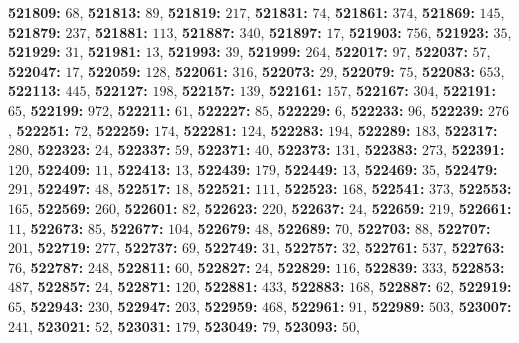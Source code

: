 \textsf{\bfseries 521809:} $68$, \textsf{\bfseries 521813:} $89$, \textsf{\bfseries 521819:} $217$, \textsf{\bfseries 521831:} $74$, \textsf{\bfseries 521861:} $374$, \textsf{\bfseries 521869:} $145$, \textsf{\bfseries 521879:} $237$, \textsf{\bfseries 521881:} $113$, \textsf{\bfseries 521887:} $340$, \textsf{\bfseries 521897:} $17$, \textsf{\bfseries 521903:} $756$, \textsf{\bfseries 521923:} $35$, \textsf{\bfseries 521929:} $31$, \textsf{\bfseries 521981:} $13$, \textsf{\bfseries 521993:} $39$, \textsf{\bfseries 521999:} $264$, \textsf{\bfseries 522017:} $97$, \textsf{\bfseries 522037:} $57$, \textsf{\bfseries 522047:} $17$, \textsf{\bfseries 522059:} $128$, \textsf{\bfseries 522061:} $316$, \textsf{\bfseries 522073:} $29$, \textsf{\bfseries 522079:} $75$, \textsf{\bfseries 522083:} $653$, \textsf{\bfseries 522113:} $445$, \textsf{\bfseries 522127:} $198$, \textsf{\bfseries 522157:} $139$, \textsf{\bfseries 522161:} $157$, \textsf{\bfseries 522167:} $304$, \textsf{\bfseries 522191:} $65$, \textsf{\bfseries 522199:} $972$, \textsf{\bfseries 522211:} $61$, \textsf{\bfseries 522227:} $85$, \textsf{\bfseries 522229:} $6$, \textsf{\bfseries 522233:} $96$, \textsf{\bfseries 522239:} $276$, \textsf{\bfseries 522251:} $72$, \textsf{\bfseries 522259:} $174$, \textsf{\bfseries 522281:} $124$, \textsf{\bfseries 522283:} $194$, \textsf{\bfseries 522289:} $183$, \textsf{\bfseries 522317:} $280$, \textsf{\bfseries 522323:} $24$, \textsf{\bfseries 522337:} $59$, \textsf{\bfseries 522371:} $40$, \textsf{\bfseries 522373:} $131$, \textsf{\bfseries 522383:} $273$, \textsf{\bfseries 522391:} $120$, \textsf{\bfseries 522409:} $11$, \textsf{\bfseries 522413:} $13$, \textsf{\bfseries 522439:} $179$, \textsf{\bfseries 522449:} $13$, \textsf{\bfseries 522469:} $35$, \textsf{\bfseries 522479:} $291$, \textsf{\bfseries 522497:} $48$, \textsf{\bfseries 522517:} $18$, \textsf{\bfseries 522521:} $111$, \textsf{\bfseries 522523:} $168$, \textsf{\bfseries 522541:} $373$, \textsf{\bfseries 522553:} $165$, \textsf{\bfseries 522569:} $260$, \textsf{\bfseries 522601:} $82$, \textsf{\bfseries 522623:} $220$, \textsf{\bfseries 522637:} $24$, \textsf{\bfseries 522659:} $219$, \textsf{\bfseries 522661:} $11$, \textsf{\bfseries 522673:} $85$, \textsf{\bfseries 522677:} $104$, \textsf{\bfseries 522679:} $48$, \textsf{\bfseries 522689:} $70$, \textsf{\bfseries 522703:} $88$, \textsf{\bfseries 522707:} $201$, \textsf{\bfseries 522719:} $277$, \textsf{\bfseries 522737:} $69$, \textsf{\bfseries 522749:} $31$, \textsf{\bfseries 522757:} $32$, \textsf{\bfseries 522761:} $537$, \textsf{\bfseries 522763:} $76$, \textsf{\bfseries 522787:} $248$, \textsf{\bfseries 522811:} $60$, \textsf{\bfseries 522827:} $24$, \textsf{\bfseries 522829:} $116$, \textsf{\bfseries 522839:} $333$, \textsf{\bfseries 522853:} $487$, \textsf{\bfseries 522857:} $24$, \textsf{\bfseries 522871:} $120$, \textsf{\bfseries 522881:} $433$, \textsf{\bfseries 522883:} $168$, \textsf{\bfseries 522887:} $62$, \textsf{\bfseries 522919:} $65$, \textsf{\bfseries 522943:} $230$, \textsf{\bfseries 522947:} $203$, \textsf{\bfseries 522959:} $468$, \textsf{\bfseries 522961:} $91$, \textsf{\bfseries 522989:} $503$, \textsf{\bfseries 523007:} $241$, \textsf{\bfseries 523021:} $52$, \textsf{\bfseries 523031:} $179$, \textsf{\bfseries 523049:} $79$, \textsf{\bfseries 523093:} $50$, 
